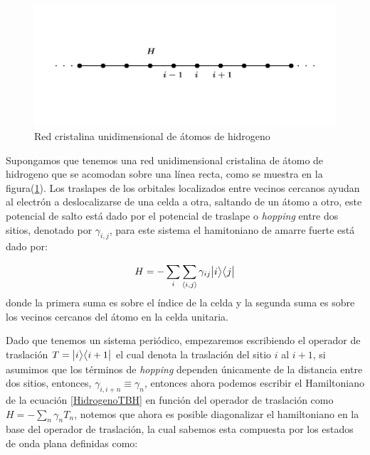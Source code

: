     \begin{figure}[h!]
        \centering
        \includegraphics[width=\textwidth]{Imagenes/Models/TB_example.pdf}\vspace{-1.5cm}
        \caption{Red cristalina unidimensional de átomos de hidrogeno}
        \label{fig:Hidrogen_chain}
    \end{figure}
    
    Supongamos que tenemos una red unidimensional cristalina de átomo de hidrogeno que se acomodan sobre una línea recta, como se muestra en la figura(\ref{fig:Hidrogen_chain}). Los traslapes de los orbitales localizados entre vecinos cercanos ayudan al electrón a deslocalizarse de una celda a otra, saltando de un átomo a otro, este potencial de salto está dado por el potencial de traslape o \textit{hopping} entre dos sitios, denotado por $\gamma_{i,j}$, para este sistema el hamitoniano de amarre fuerte está dado por:

    \begin{equation}
        \label{HidrogenoTBH}
        H =  -\sum_{i}\sum_{\langle i, j \rangle } \gamma_{ij} \big |{i}\big \rangle\big \langle{j}\big |
    \end{equation}
    donde la primera suma es sobre el índice de la celda y la segunda suma es sobre los vecinos cercanos del átomo en la celda unitaria.
    
    Dado que tenemos un sistema periódico, empezaremos escribiendo el operador de traslación $T = \big |{i}\big \rangle\big \langle{i+1}\big |$ el cual denota la traslación del sitio $i$ al $i+1$, si asumimos que los términos de {\it hopping} dependen únicamente de la distancia entre dos sitios, entonces, $\gamma_{i,i+n} \equiv \gamma_{n}$, entonces ahora podemos escribir el Hamiltoniano de la ecuación \ref{HidrogenoTBH} en función del operador de traslación como $H = -\sum_n \gamma_n T_n$, notemos que ahora es posible diagonalizar el hamiltoniano en la base del operador de traslación, la cual sabemos esta compuesta por los estados de onda plana definidas como:

